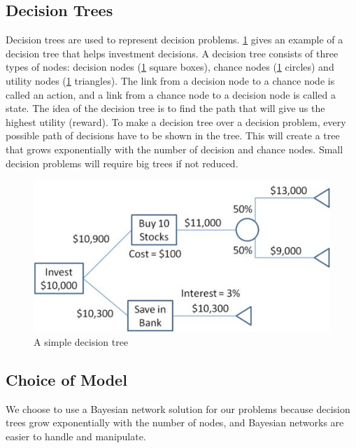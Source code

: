 \subsection{Decision Trees}
Decision trees are used to represent decision problems. \ref{fig:basicdecisiontree} gives an example of a decision tree that helps investment decisions. A decision tree consists of three types of nodes: decision nodes (\ref{fig:basicdecisiontree} square boxes), chance nodes (\ref{fig:basicdecisiontree} circles) and utility nodes (\ref{fig:basicdecisiontree} triangles). The link from a decision node to a chance node is called an action, and a link from a chance node to a decision node is called a state. The idea of the decision tree is to find the path that will give us the highest utility (reward). To make a decision tree over a decision problem, every possible path of decisions have to be shown in the tree. This will create a tree that grows exponentially with the number of decision and chance nodes. Small decision problems will require big trees if not reduced. 
	
\begin{figure}[H]
\includegraphics[scale=.8]{Figures/BayesianPictures/SimpleDecisionTree.png}
\caption{A simple decision tree \cite{sdt}}
\label{fig:basicdecisiontree}
\end{figure}

\subsection{Choice of Model}
We choose to use a Bayesian network solution for our problems because decision trees grow exponentially with the number of nodes, and 
Bayesian networks are easier to handle and manipulate.
